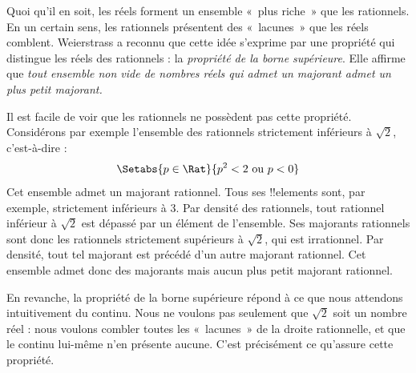 \documentclass[../../../include/open-logic-section]{subfiles}
\begin{document}
Quoi qu'il en soit, les réels forment un ensemble «~plus riche~» que les
rationnels. En un certain sens, les rationnels présentent des «~lacunes~»
que les réels comblent. Weierstrass a reconnu que cette idée s'exprime
par une propriété qui distingue les réels des rationnels : la
\emph{propriété de la borne supérieure}. Elle affirme que
\emph{tout ensemble non vide de nombres réels qui admet un majorant
admet un plus petit majorant.}

Il est facile de voir que les rationnels ne possèdent pas cette
propriété. Considérons par exemple l'ensemble des rationnels
strictement inférieurs à $\sqrt{2}$, c'est-à-dire :
\[
	\Setabs{p \in \Rat}{p^2 < 2 \text{ ou }p < 0}
\]
Cet ensemble admet un majorant rationnel. Tous ses !!{element}s sont,
par exemple, strictement inférieurs à $3$. Par densité des rationnels,
tout rationnel inférieur à $\sqrt{2}$ est dépassé par un élément de
l’ensemble. Ses majorants rationnels sont donc les rationnels
strictement supérieurs à $\sqrt{2}$, qui est irrationnel.
Par densité, tout tel majorant est précédé d’un autre majorant rationnel.
Cet ensemble admet donc des majorants mais aucun plus petit
majorant rationnel.

En revanche, la propriété de la borne supérieure répond à ce que nous
attendons intuitivement du continu. Nous ne voulons pas seulement que
$\sqrt{2}$ soit un nombre réel : nous voulons combler toutes les
«~lacunes~» de la droite rationnelle, et que le continu lui-même n'en
présente aucune. C'est précisément ce qu'assure cette propriété.
\end{document}
